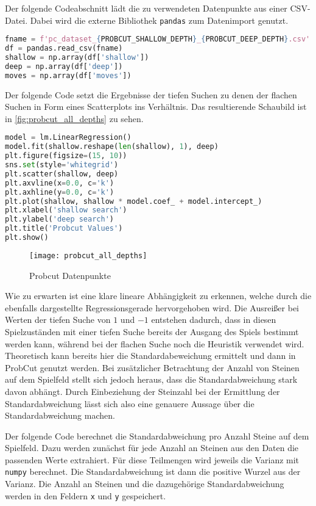 Der folgende Codeabschnitt lädt die zu verwendeten Datenpunkte aus einer
CSV-Datei. Dabei wird die externe Bibliothek
\passthrough{\lstinline!pandas!} zum Datenimport genutzt.

\begin{lstlisting}[language=Python]
fname = f'pc_dataset_{PROBCUT_SHALLOW_DEPTH}_{PROBCUT_DEEP_DEPTH}.csv'
df = pandas.read_csv(fname)
shallow = np.array(df['shallow'])
deep = np.array(df['deep'])
moves = np.array(df['moves'])
\end{lstlisting}

Der folgende Code setzt die Ergebnisse der tiefen Suchen zu denen der
flachen Suchen in Form eines Scatterplots ins Verhältnis. Das
resultierende Schaubild ist in \autoref{fig:probcut_all_depths} zu
sehen.

\begin{lstlisting}[language=Python]
model = lm.LinearRegression()
model.fit(shallow.reshape(len(shallow), 1), deep)
plt.figure(figsize=(15, 10))
sns.set(style='whitegrid')
plt.scatter(shallow, deep)
plt.axvline(x=0.0, c='k')
plt.axhline(y=0.0, c='k')
plt.plot(shallow, shallow * model.coef_ + model.intercept_)
plt.xlabel('shallow search')
plt.ylabel('deep search')
plt.title('Probcut Values')
plt.show()
\end{lstlisting}

\begin{figure}[H]
    \centering
    \texttt{[image: probcut\_all\_depths]}
    \caption{Probcut Datenpunkte}
    \label{fig:probcut_all_depths}
\end{figure}

Wie zu erwarten ist eine klare lineare Abhängigkeit zu erkennen, welche
durch die ebenfalls dargestellte Regressionsgerade hervorgehoben wird.
Die Ausreißer bei Werten der tiefen Suche von \(1\) und \(-1\) entstehen
dadurch, dass in diesen Spielzuständen mit einer tiefen Suche bereits
der Ausgang des Spiels bestimmt werden kann, während bei der flachen
Suche noch die Heuristik verwendet wird. Theoretisch kann bereits hier
die Standardabeweichung ermittelt und dann in ProbCut genutzt werden.
Bei zusätzlicher Betrachtung der Anzahl von Steinen auf dem Spielfeld
stellt sich jedoch heraus, dass die Standardabweichung stark davon
abhängt. Durch Einbeziehung der Steinzahl bei der Ermittlung der
Standardabweichung lässt sich also eine genauere Aussage über die
Standardabweichung machen.

Der folgende Code berechnet die Standardabweichung pro Anzahl Steine auf
dem Spielfeld. Dazu werden zunächst für jede Anzahl an Steinen aus den
Daten die passenden Werte extrahiert. Für diese Teilmengen wird jeweils
die Varianz mit \passthrough{\lstinline!numpy!} berechnet. Die
Standardabweichung ist dann die positive Wurzel aus der Varianz. Die
Anzahl an Steinen und die dazugehörige Standardabweichung werden in den
Feldern \passthrough{\lstinline!x!} und \passthrough{\lstinline!y!}
gespeichert.

